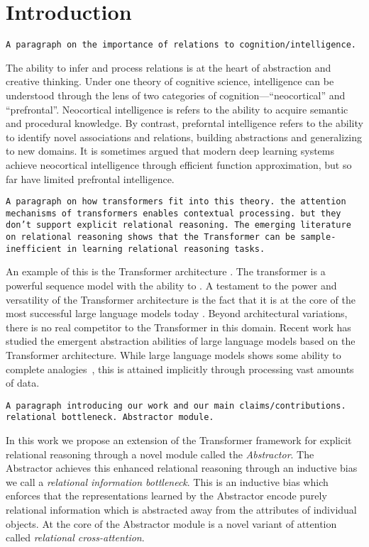 \section{Introduction}

\texttt{A paragraph on the importance of relations to cognition/intelligence.}

The ability to infer and process relations is at the heart of abstraction and creative thinking. Under one theory of cognitive science, intelligence can be understood through the lens of two categories of cognition---``neocortical'' and ``prefrontal''. Neocortical intelligence is refers to the ability to acquire semantic and procedural knowledge. By contrast, preforntal intelligence refers to the ability to identify novel associations and relations, building abstractions and generalizing to new domains. It is sometimes argued that modern deep learning systems achieve neocortical intelligence through efficient function approximation, but so far have limited prefrontal intelligence.

\texttt{A paragraph on how transformers fit into this theory. the attention mechanisms of transformers enables contextual processing. but they don't support explicit relational reasoning. The emerging literature on relational reasoning shows that the Transformer can be sample-inefficient in learning relational reasoning tasks.}

An example of this is the Transformer architecture \citep{vaswani2017attention}. The transformer is a powerful sequence model with the ability to . A testament to the power and versatility of the Transformer architecture is the fact that it is at the core of the most successful large language models today \citep{gpt3,gpt4,llamma,T5,etc?}. Beyond architectural variations, there is no real competitor to the Transformer in this domain. Recent work has studied the emergent abstraction abilities of large language models based on the Transformer architecture. While large language models shows some ability to complete analogies~\citep{}, this is attained implicitly through processing vast amounts of data.

\texttt{A paragraph introducing our work and our main claims/contributions. relational bottleneck. Abstractor module.}

In this work we propose an extension of the Transformer framework for explicit relational reasoning through a novel module called the \textit{Abstractor}. The Abstractor achieves this enhanced relational reasoning through an inductive bias we call a \textit{relational information bottleneck}. This is an inductive bias which enforces that the representations learned by the Abstractor encode purely relational information which is abstracted away from the attributes of individual objects. At the core of the Abstractor module is a novel variant of attention called \textit{relational cross-attention}.

